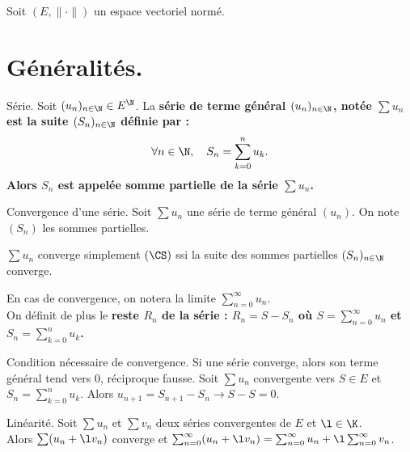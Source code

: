 \documentclass[11pt]{article}
\begin{document}


\thispagestyle{fancy}

Soit $(E,\|\cdot\|)$ un espace vectoriel normé.

\section{Généralités.}

\begin{defi}{Série.}{}
    Soit $(u_n)_{n\in\N}\in E^\N$. La \bf{série} de terme général $(u_n)_{n\in\N}$, notée $\sum u_n$ est la suite $(S_n)_{n\in\N}$ définie par :
    \begin{equation*}
        \forall n \in \N, \quad S_n = \sum_{k=0}^n u_k.
    \end{equation*}
    Alors $S_n$ est appelée \bf{somme partielle} de la série $\sum u_n$.
\end{defi}

\begin{defi}{Convergence d'une série.}{}
    Soit $\sum u_n$ une série de terme général $(u_n)$. On note $(S_n)$ les sommes partielles.
    \begin{center}
        $\sum u_n$ converge simplement $(\CS)$ ssi la suite des sommes partielles $(S_n)_{n\in\N}$ converge.
    \end{center}
    En cas de convergence, on notera la limite $\sum_{n=0}^{\infty}u_n$.\\
    On définit de plus le \bf{reste} $R_n$ de la série : $R_n=S-S_n$ où $S=\sum_{n=0}^\infty u_n$ et $S_n=\sum_{k=0}^nu_k$.
\end{defi}

\begin{prop}{Condition nécessaire de convergence.}{}
    Si une série converge, alors son terme général tend vers 0, réciproque fausse.
    \tcblower
    Soit $\sum u_n$ convergente vers $S\in E$ et $S_n=\sum_{k=0}^nu_k$. Alors $u_{n+1}=S_{n+1}-S_n\to S-S = 0$.
\end{prop}

\begin{prop}{Linéarité.}{}
    Soit $\sum u_n$ et $\sum v_n$ deux séries convergentes de $E$ et $\l\in\K$.\\
    Alors $\sum(u_n +\l v_n)$ converge et $\sum_{n=0}^\infty(u_n+\l v_n) = \sum_{n=0}^\infty u_n + \l\sum_{n=0}^\infty v_n$.
\end{prop}

\vspace*{-0.7cm}
\end{document}
